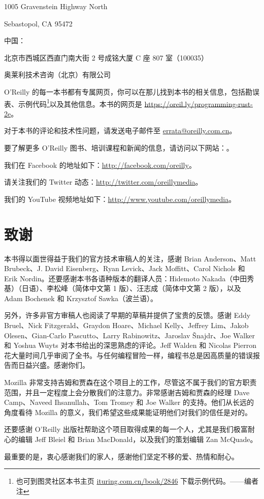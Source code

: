 1005 Gravenstein Highway North

Sebastopol, CA 95472

中国：

北京市西城区西直门南大街 2 号成铭大厦 C 座 807 室（100035）

奥莱利技术咨询（北京）有限公司

O'Reilly 的每一本书都有专属网页，你可以在那儿找到本书的相关信息，包括勘误表、示例代码\footnote{也可到图灵社区本书主页 \href{http://ituring.com.cn/book/2846}{ituring.com.cn/\allowbreak{}book/\allowbreak{}2846} 下载示例代码。——编者注}以及其他信息。本书的网页是 \href{https://oreil.ly/programming-rust-2e}{https://oreil.ly/\allowbreak{}programming-rust-2e}。

对于本书的评论和技术性问题，请发送电子邮件至 \href{mailto:errata@oreilly.com.cn}{errata@oreilly.com.cn}。

要了解更多 O'Reilly 图书、培训课程和新闻的信息，请访问以下网站：。

我们在 Facebook 的地址如下：\href{http://facebook.com/oreilly}{http://facebook.com/\allowbreak{}oreilly}。

请关注我们的 Twitter 动态：\href{http://twitter.com/oreillymedia}{http://twitter.com/\allowbreak{}oreillymedia}。

我们的 YouTube 视频地址如下：\href{http://www.youtube.com/oreillymedia}{http://www.youtube.com/\allowbreak{}oreillymedia}。

\section{致谢}

本书得以面世得益于我们的官方技术审稿人的关注，感谢 Brian Anderson、Matt Brubeck、J. David Eisenberg、Ryan Levick、Jack Moffitt、Carol Nichols 和 Erik Nordin。还要感谢本书各语种版本的翻译人员：Hidemoto Nakada（中田秀基）（日语）、李松峰（简体中文第 1 版）、汪志成（简体中文第 2 版），以及 Adam Bochenek 和 Krzysztof Sawka（波兰语）。

另外，许多非官方审稿人也阅读了早期的草稿并提供了宝贵的反馈。感谢 Eddy Bruel、Nick Fitzgerald、Graydon Hoare、Michael Kelly、Jeffrey Lim、Jakob Olesen、Gian-Carlo Pascutto、Larry Rabinowitz、Jaroslav Šnajdr、Joe Walker 和 Yoshua Wuyts 对本书给出的深思熟虑的评论。Jeff Walden 和 Nicolas Pierron 花大量时间几乎审阅了全书。与任何编程冒险一样，编程书总是因高质量的错误报告而日益兴盛。感谢你们。

Mozilla 非常支持吉姆和贾森在这个项目上的工作，尽管这不属于我们的官方职责范围，并且一定程度上会分散我们的注意力。非常感谢吉姆和贾森的经理 Dave Camp、Naveed Ihsanullah、Tom Tromey 和 Joe Walker 的支持。他们从长远的角度看待 Mozilla 的意义，我们希望这些成果能证明他们对我们的信任是对的。

还要感谢 O'Reilly 出版社帮助这个项目取得成果的每一个人，尤其是我们极富耐心的编辑 Jeff Bleiel 和 Brian MacDonald，以及我们的策划编辑 Zan McQuade。

最重要的是，衷心感谢我们的家人，感谢他们坚定不移的爱、热情和耐心。

